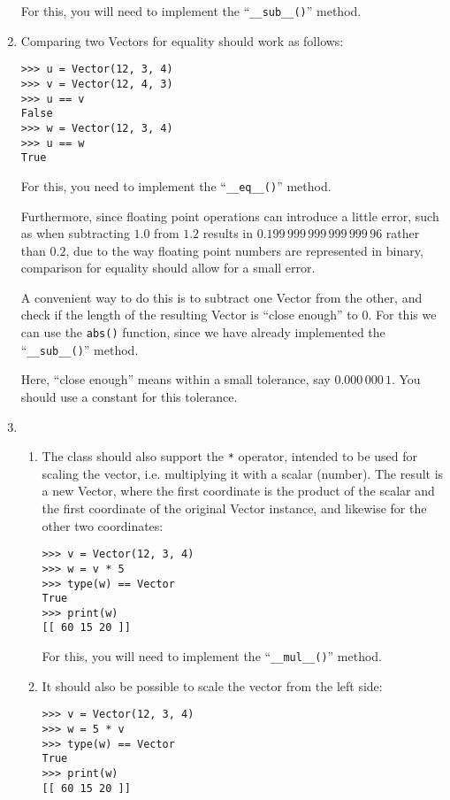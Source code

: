 \begin{enumerate}
For this, you will need to implement the ``\texttt{\_\_sub\_\_()}'' method.

\item
Comparing two Vectors for equality should work as follows:
\begin{verbatim}
>>> u = Vector(12, 3, 4)
>>> v = Vector(12, 4, 3)
>>> u == v
False
>>> w = Vector(12, 3, 4)
>>> u == w
True
\end{verbatim}

For this, you need to implement the ``\texttt{\_\_eq\_\_()}'' method.

Furthermore, since floating point operations can introduce a little error,
such as when subtracting $1.0$ from $1.2$
results in $0.199\,999\,999\,999\,999\,96$ rather than $0.2$,
due to the way floating point numbers are represented in binary,
comparison for equality should allow for a small error.

A convenient way to do this is to subtract one Vector from the other,
and check if the length of the resulting Vector is ``close enough'' to $0$.
For this we can use the \texttt{abs()} function,
since we have already implemented the ``\texttt{\_\_sub\_\_()}'' method.

Here, ``close enough'' means within a small tolerance, say $0.000\,000\,1$.
You should use a constant for this tolerance.

\item
\begin{enumerate}

\item
The class should also support the \texttt{*} operator,
intended to be used for scaling the vector,
i.e. multiplying it with a scalar (number).
The result is a new Vector, where the first coordinate is
the product of the scalar and the first coordinate of the original Vector instance,
and likewise for the other two coordinates:
\begin{verbatim}
>>> v = Vector(12, 3, 4)
>>> w = v * 5
>>> type(w) == Vector
True
>>> print(w)
[[ 60 15 20 ]]
\end{verbatim}

For this, you will need to implement the ``\texttt{\_\_mul\_\_()}'' method.

\item
It should also be possible to scale the vector from the left side:
\begin{verbatim}
>>> v = Vector(12, 3, 4)
>>> w = 5 * v
>>> type(w) == Vector
True
>>> print(w)
[[ 60 15 20 ]]
\end{verbatim}


\end{enumerate}
\end{enumerate}
